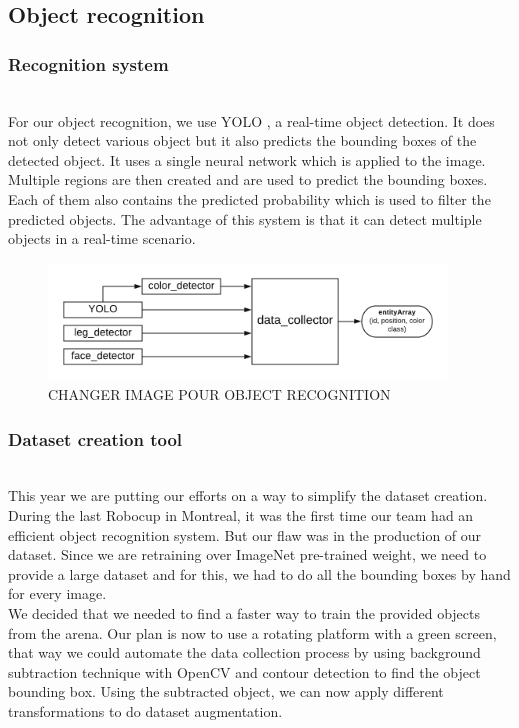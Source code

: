 \documentclass[runningheads,a4paper]{llncs}
\begin{document}
\subsection{Object recognition}
\subsubsection{Recognition system}
\hfill\\

For our object recognition, we use YOLO \cite{yolo}, a real-time object detection. It does not only detect various object but it also predicts the bounding boxes of the detected object. It uses a single neural network which is applied to the image. Multiple regions are then created and are used to predict the bounding boxes. Each of them also contains the predicted probability which is used to filter the predicted objects. The advantage of this system is that it can detect multiple objects in a real-time scenario.\\

\begin{figure}
  \centering
  \includegraphics[width=300pt]{images/wm_data_collector.png}
  \caption{ CHANGER IMAGE POUR OBJECT RECOGNITION}
\end{figure} 

\subsubsection{Dataset creation tool}
\hfill\\

This year we are putting our efforts on a way to simplify the dataset creation. During the last Robocup in Montreal, it was the first time our team had an efficient object recognition system. But our flaw was in the production of our dataset. Since we are retraining over ImageNet pre-trained weight, we need to provide a large dataset and for this, we had to do all the bounding boxes by hand for every image.\\
 
We decided that we needed to find a faster way to train the provided objects from the arena. Our plan is now to use a rotating platform with a green screen, that way we could automate the data collection process by using background subtraction technique with OpenCV and contour detection to find the object bounding box. Using the subtracted object, we can now apply different transformations to do dataset augmentation. \\
\end{document}
